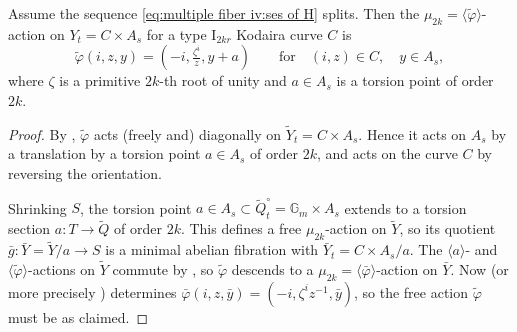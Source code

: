 \documentclass[reqno, letterpaper]{amsart}
\numberwithin{equation}{subsection}
\let\to\longrightarrow
\newcommand{\GG}{\mathbb{G}}
\begin{document}
			\begin{lemma} \label{lem:multiple fiber iv:varphi-action for split H}
				Assume the sequence \eqref{eq:multiple fiber iv:ses of H} splits. Then the $\mu_{2k} = \langle \tilde \varphi \rangle$-action on $Y_t = C \times A_s$ for a type $\mathrm I_{2kr}$ Kodaira curve $C$ is
				\[ \tilde \varphi(i,z,y) = (-i, \tfrac{\zeta^i}{z}, y+a) \qquad\mbox{for}\quad (i,z) \in C , \quad y \in A_s ,\]
				where $\zeta$ is a primitive $2k$-th root of unity and $a \in A_s$ is a torsion point of order $2k$.
			\end{lemma}
			\begin{proof}
				By , $\tilde \varphi$ acts (freely and) diagonally on $\tilde Y_t = C \times A_s$. Hence it acts on $A_s$ by a translation by a torsion point $a \in A_s$ of order $2k$, and acts on the curve $C$ by reversing the orientation.
				
				Shrinking $S$, the torsion point $a \in A_s \subset \tilde Q_t^\circ = \GG_m \times A_s$ extends to a torsion section $a : T \to \tilde Q$ of order $2k$. This defines a free $\mu_{2k}$-action on $\tilde Y$, so its quotient $\bar g : \bar Y = \tilde Y / a \to S$ is a minimal abelian fibration with $\bar Y_t = C \times A_s/a$. The $\langle a \rangle$- and $\langle \tilde \varphi \rangle$-actions on $\tilde Y$ commute by , so $\tilde \varphi$ descends to a $\mu_{2k} = \langle \bar \varphi \rangle$-action on $\bar Y$. Now  (or more precisely ) determines $\bar \varphi(i,z,\bar y) = (-i, \zeta^i z^{-1}, \bar y)$, so the free action $\tilde \varphi$ must be as claimed.
			\end{proof}
			
\end{document}
